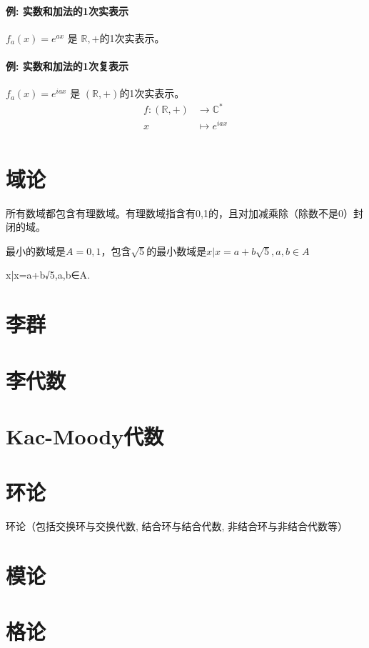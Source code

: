 \documentclass[UTF8]{../09-Mathematics}
\begin{document}
\subsubsection{例: 实数和加法的1次实表示}
$f_a(x)=e^{ax}$ 是 $\mathbb R, +$的1次实表示。

\subsubsection{例: 实数和加法的1次复表示}
$f_a(x)=e^{iax}$ 是 $(\mathbb R, +)$的1次实表示。
\begin{equation}
\label{fubiaohsi}
\begin{split}
f:(\mathbb R, +) &\to \mathbb C^*\\
x  &\mapsto e^{iax}\\
\end{split}
\end{equation}
 



\chapter{域论}

所有数域都包含有理数域。有理数域指含有0,1的，且对加减乘除（除数不是0）封闭的域。

最小的数域是$A = {0,1}$，包含$\sqrt{5}$的最小数域是$ x| x = a + b\sqrt{5}, a , b \in A$

{x|x=a+b√5,a,b∈A}.

\chapter{李群}
\chapter{李代数}
\chapter{Kac-Moody代数}
\chapter{环论}
环论（包括交换环与交换代数, 结合环与结合代数, 非结合环与非结合代数等）
\chapter{模论}
\chapter{格论}
\end{document}
